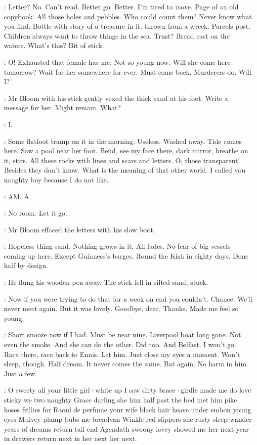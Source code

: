 \Bloom:
Letter?
No.
Can't read.
Better go.
Better.
I'm tired to move.
Page of an old copybook.
All those holes and
pebbles.
Who could count them?
Never know what you find.
Bottle with
story of a treasure in it,
thrown from a wreck.
Parcels post.
Children
always want to throw things in the sea.
Trust?
Bread cast on the waters.
What's this?
Bit of stick.

\Bloom:
O!
Exhausted that female has me.
Not so young now.
Will she come
here tomorrow?
Wait for her somewhere for ever.
Must come back.
Murderers do.
Will I?

:
Mr Bloom with his stick gently vexed the thick sand at his foot.
Write a message for her.
Might remain.
What?

\Bloom:
I.

\Bloom:
Some flatfoot tramp on it in the morning.
Useless.
Washed away.
Tide comes here.
Saw a pool near her foot.
Bend,
see my face there,
dark mirror,
breathe on it,
stirs.
All these rocks with lines and scars and letters.
O,
those transparent!
Besides they don't know.
What is the meaning of that
other world.
I called you naughty boy because I do not like.

\Bloom:
AM.
A.

\Bloom:
No room.
Let it go.

:
Mr Bloom effaced the letters with his slow boot.

\Bloom:
Hopeless thing sand.
Nothing grows in it.
All fades.
No fear of big vessels coming up here.
Except Guinness's barges.
Round the Kish in eighty days.
Done half by
design.

:
He flung his wooden pen away.
The stick fell in silted sand,
stuck.

\Bloom:
Now if you were trying to do that for a week on end you couldn't.
Chance.
We'll never meet again.
But it was lovely.
Goodbye,
dear.
Thanks.
Made me
feel so young.

\Bloom:
Short snooze now if I had.
Must be near nine.
Liverpool boat long
gone.
Not even the smoke.
And she can do the other.
Did too.
And Belfast.
I won't go.
Race there,
race back to Ennis.
Let him.
Just close my eyes a
moment.
Won't sleep,
though.
Half dream.
It never comes the same.
Bat
again.
No harm in him.
Just a few.

\Bloom:
O sweety all your little girl·white up I saw dirty brace·girdle made me
do love sticky we two naughty Grace darling
she him half past the bed met
him pike hoses frillies for Raoul de perfume your wife black hair heave
under embon  young eyes Mulvey plump bubs me breadvan Winkle
red slippers she rusty sleep wander years of dreams return tail end
Agendath swoony lovey showed me her next year in drawers return next in
her next her next.

